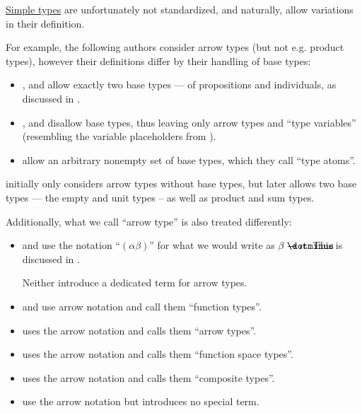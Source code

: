 \begin{remark}\label{rem:simple_type_etymology}
  \hyperref[def:simple_type]{Simple types} are unfortunately not standardized, and naturally, allow variations in their definition.

  For example, the following authors consider arrow types (but not e.g. product types), however their definitions differ by their handling of base types:
  \begin{itemize}
    \item {},  and  allow exactly two base types --- of propositions and individuals, as discussed in .

    \item {},  and  disallow base types, thus leaving only arrow types and \enquote{type variables} (resembling the variable placeholders from ).

    \item {} allow an arbitrary nonempty set of base types, which they call \enquote{type atoms}.
  \end{itemize}

   initially only considers arrow types without base types, but later allows two base types --- the empty and unit types -- as well as product and sum types.

  Additionally, what we call \enquote{arrow type} is also treated differently:
  \begin{itemize}
    \item {} and  use the notation \enquote{\( (\alpha\beta) \)} for what we would write as \( \beta \synimplies \alpha \). This is discussed in .

    Neither introduce a dedicated term for arrow types.

    \item {} and  use arrow notation and call them \enquote{function types}.

    \item {} uses the arrow notation and calls them \enquote{arrow types}.

    \item {} uses the arrow notation and calls them \enquote{function space types}.

    \item {} uses the arrow notation and calls them \enquote{composite types}.

    \item {} use the arrow notation but introduces no special term.
  \end{itemize}
\end{remark}

